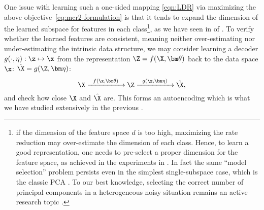 \documentclass[../../book-main.tex]{subfiles}
\begin{document}
{One issue with learning such a one-sided mapping \eqref{eqn:LDR} via  maximizing the above \mbox{objective \eqref{eq:mcr2-formulation}} is that it tends to expand the dimension of the learned subspace for features in each class\footnote{if the dimension of the feature space $d$ is too high, maximizing the rate reduction may over-estimate the dimension of each class. Hence, to learn a good representation, one needs to pre-select a proper dimension for the feature space, as achieved in the experiments in \cite{yu2020learning}. In fact the same ``model selection'' problem persists even in the simplest single-subspace case, which is the classic PCA \cite{Jolliffe1986}. To our best knowledge, selecting the correct number of principal components in a heterogeneous noisy situation remains an active research topic \cite{hong2020selecting}.}, as we have seen in  of . To verify whether the learned features are consistent, meaning neither over-estimating nor under-estimating the intrinsic data structure, we may consider learning a decoder $g(\cdot,\eta): \z \mapsto  \x$ from the representation $\Z = f(\X,\bm\theta)$ back to the data space $\x$: $\hat \X = g(\Z, \bm\eta)$:
\begin{equation}
    \X \xrightarrow{\hspace{2mm} f(\x, \bm\theta)\hspace{2mm}} \Z \xrightarrow{\hspace{2mm} g(\z, \bm \eta) \hspace{2mm}} \hat \X, 
    \label{eqn:autoencoding-ch6}
\end{equation}
and check how close $\X$ and $\hat \X$ are. This forms an autoencoding which is  what we have studied extensively in the previous .

}
\end{document}
